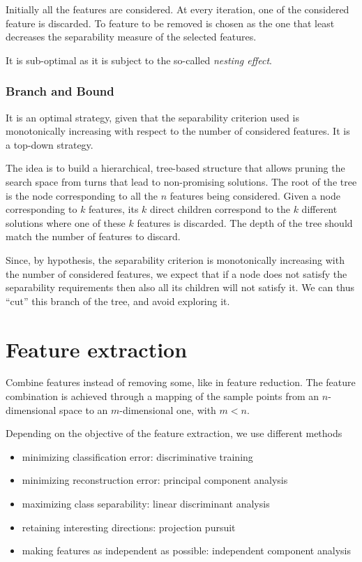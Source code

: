 \documentclass[oneside,onecolumn]{report}
\begin{document}
Initially all the features are considered.
At every iteration, one of the considered feature is discarded.
To feature to be removed is chosen as the one that least decreases the separability measure of the selected features.

It is sub-optimal as it is subject to the so-called \emph{nesting effect}.

\subsubsection{Branch and Bound}
It is an optimal strategy, given that the separability criterion used is monotonically increasing with respect to the number of considered features.
It is a top-down strategy.

The idea is to build a hierarchical, tree-based structure that allows pruning the search space from turns that lead to non-promising solutions.
The root of the tree is the node corresponding to all the $n$ features being considered.
Given a node corresponding to $k$ features, its $k$ direct children correspond to the $k$ different solutions where one of these $k$ features is discarded.
The depth of the tree should match the number of features to discard.

Since, by hypothesis, the separability criterion is monotonically increasing with the number of considered features, we expect that if a node does not satisfy the separability requirements then also all its children will not satisfy it.
We can thus ``cut'' this branch of the tree, and avoid exploring it.


\section{Feature extraction}
Combine features instead of removing some, like in feature reduction.
The feature combination is achieved through a mapping of the sample points from an $n$-dimensional space to an $m$-dimensional one, with $m < n$.

Depending on the objective of the feature extraction, we use different methods
\begin{itemize}
    \item minimizing classification error: discriminative training
    \item minimizing reconstruction error: principal component analysis
    \item maximizing class separability: linear discriminant analysis
    \item retaining interesting directions: projection pursuit
    \item making features as independent as possible: independent component analysis
\end{itemize}
\end{document}
